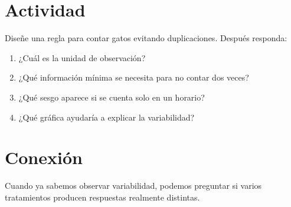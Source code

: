 \section{Actividad}

Diseñe una regla para contar gatos evitando duplicaciones. Después responda:

\begin{enumerate}
  \item ¿Cuál es la unidad de observación?
  \item ¿Qué información mínima se necesita para no contar dos veces?
  \item ¿Qué sesgo aparece si se cuenta solo en un horario?
  \item ¿Qué gráfica ayudaría a explicar la variabilidad?
\end{enumerate}

\section{Conexión}

Cuando ya sabemos observar variabilidad, podemos preguntar si varios tratamientos producen respuestas realmente distintas.
